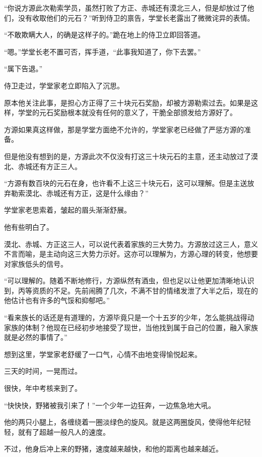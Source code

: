 
\begin{this_body}

“你说方源此次勒索学员，虽然打败了方正、赤城还有漠北三人，但是却放过了他们，没有收取他们的元石？”听到侍卫的禀告，学堂长老露出了微微诧异的表情。

“不敢欺瞒大人，的确是这样子的。”跪在地上的侍卫立即回答道。

“嗯。”学堂长老不置可否，挥手道，“此事我知道了，你下去罢。”

“属下告退。”

侍卫走过，学堂家老立即陷入了沉思。

原本他关注此事，是担心方正得了三十块元石奖励，却被方源勒索过去。如果是这样，学堂的元石奖励根本就没有任何的意义了，干脆全部颁发给方源好了。

方源如果真这样做，那是学堂方面绝不允许的，学堂家老已经做了严惩方源的准备。

但是他没有想到的是，方源此次不仅没有打这三十块元石的主意，还主动放过了漠北、赤城还有方正三人。

“方源有数百块的元石在身，也许看不上这三十块元石，这可以理解。但是主送放弃勒索漠北、赤城还有方正，这是什么缘由？”

学堂家老思索着，皱起的眉头渐渐舒展。

他有些明白了。

漠北、赤城、方正这三人，可以说代表着家族的三大势力。方源放过这三人，意义不言而喻，是主动向这三大势力示好。这亦可以理解为，方源心理的转变，他想要对家族低头的信号。

“可以理解的。随着不断地修行，方源纵然有酒虫，但也足以让他更加清晰地认识到，丙等资质的不足。先前闹腾了几次，不满不甘的情绪发泄了大半之后，现在的他估计也有许多的气馁和抑郁吧。”

“看来族长的话还是有道理的，方源毕竟只是一个十五岁的少年，怎么能挑战得动家族的体制？他现在已经初步地接受了现世，当他找到属于自己的位置，融入家族就是必然的事情了。”

想到这里，学堂家老舒缓了一口气，心情不由地变得愉悦起来。

三天的时间，一晃而过。

很快，年中考核来到了。

“快快快，野猪被我引来了！”一个少年一边狂奔，一边焦急地大吼。

他的两只小腿上，各缠绕着一圈淡绿色的旋风。就是这两圈旋风，使得他年纪轻轻，就有了超越一般凡人的速度。

不过，他身后冲上来的野猪，速度越来越快，和他的距离也越来越近。


\end{this_body}
